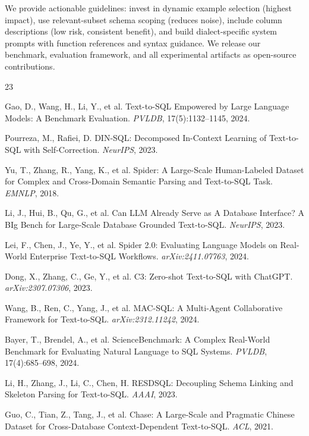 \documentclass[sigconf, nonacm]{acmart}
\begin{document}
We provide actionable guidelines: invest in dynamic example selection (highest impact), use relevant-subset schema scoping (reduces noise), include column descriptions (low risk, consistent benefit), and build dialect-specific system prompts with function references and syntax guidance. We release our benchmark, evaluation framework, and all experimental artifacts as open-source contributions.

\begin{thebibliography}{23}

 Gao, D., Wang, H., Li, Y., et al. Text-to-SQL Empowered by Large Language Models: A Benchmark Evaluation. \emph{PVLDB}, 17(5):1132--1145, 2024.

 Pourreza, M., Rafiei, D. DIN-SQL: Decomposed In-Context Learning of Text-to-SQL with Self-Correction. \emph{NeurIPS}, 2023.

 Yu, T., Zhang, R., Yang, K., et al. Spider: A Large-Scale Human-Labeled Dataset for Complex and Cross-Domain Semantic Parsing and Text-to-SQL Task. \emph{EMNLP}, 2018.

 Li, J., Hui, B., Qu, G., et al. Can LLM Already Serve as A Database Interface? A BIg Bench for Large-Scale Database Grounded Text-to-SQL. \emph{NeurIPS}, 2023.

 Lei, F., Chen, J., Ye, Y., et al. Spider 2.0: Evaluating Language Models on Real-World Enterprise Text-to-SQL Workflows. \emph{arXiv:2411.07763}, 2024.

 Dong, X., Zhang, C., Ge, Y., et al. C3: Zero-shot Text-to-SQL with ChatGPT. \emph{arXiv:2307.07306}, 2023.

 Wang, B., Ren, C., Yang, J., et al. MAC-SQL: A Multi-Agent Collaborative Framework for Text-to-SQL. \emph{arXiv:2312.11242}, 2024.

 Bayer, T., Brendel, A., et al. ScienceBenchmark: A Complex Real-World Benchmark for Evaluating Natural Language to SQL Systems. \emph{PVLDB}, 17(4):685--698, 2024.

 Li, H., Zhang, J., Li, C., Chen, H. RESDSQL: Decoupling Schema Linking and Skeleton Parsing for Text-to-SQL. \emph{AAAI}, 2023.

 Guo, C., Tian, Z., Tang, J., et al. Chase: A Large-Scale and Pragmatic Chinese Dataset for Cross-Database Context-Dependent Text-to-SQL. \emph{ACL}, 2021.


\end{thebibliography}
\end{document}
